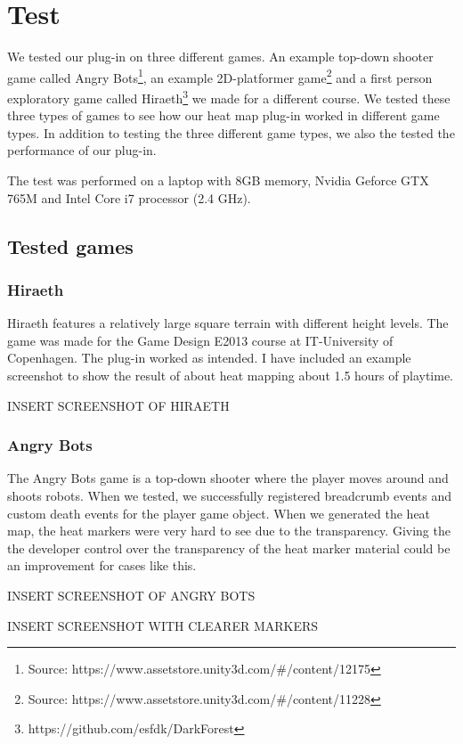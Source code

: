 \section{Test}
\label{Test}
We tested our plug-in on three different games. An example top-down shooter game called Angry Bots\footnote{Source: https://www.assetstore.unity3d.com/\#/content/12175}, an example 2D-platformer game\footnote{Source: https://www.assetstore.unity3d.com/\#/content/11228} and a first person exploratory game called Hiraeth\footnote{https://github.com/esfdk/DarkForest} we made for a different course. We tested these three types of games to see how our heat map plug-in worked in different game types. In addition to testing the three different game types, we also the tested the performance of our plug-in.

The test was performed on a laptop with 8GB memory, Nvidia Geforce GTX 765M and Intel Core i7 processor (2.4 GHz).

\subsection{Tested games}
\label{Test_TG}
\subsubsection{Hiraeth}
\label{Test_TG_H}
Hiraeth features a relatively large square terrain with different height levels. The game was made for the Game Design E2013 course at IT-University of Copenhagen. The plug-in worked as intended. I have included an example screenshot to show the result of about heat mapping about 1.5 hours of playtime.

INSERT SCREENSHOT OF HIRAETH

\subsubsection{Angry Bots}
\label{Test_TG_AB}
The Angry Bots game is a top-down shooter where the player moves around and shoots robots. When we tested, we successfully registered breadcrumb events and custom death events for the player game object. When we generated the heat map, the heat markers were very hard to see due to the transparency. Giving the the developer control over the transparency of the heat marker material could be an improvement for cases like this.

INSERT SCREENSHOT OF ANGRY BOTS

INSERT SCREENSHOT WITH CLEARER MARKERS

